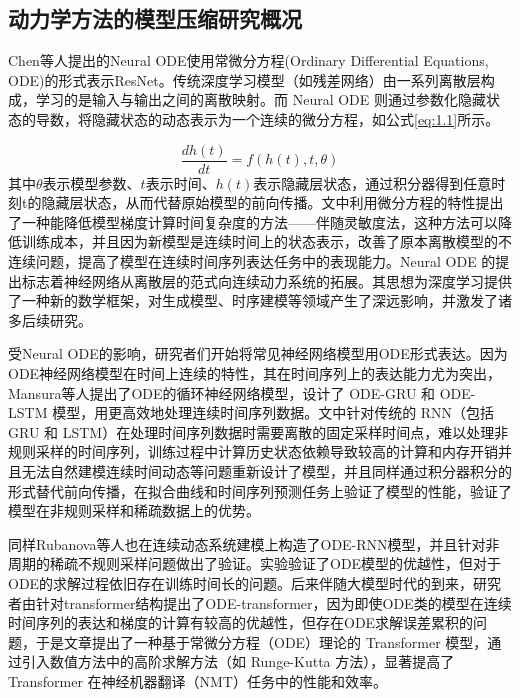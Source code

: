 \subsection{动力学方法的模型压缩研究概况}
Chen等人提出的Neural ODE\cite{chen2018neural}使用常微分方程(Ordinary Differential Equations, ODE)的形式表示ResNet\cite{he2016deep}。传统深度学习模型（如残差网络）由一系列离散层构成，学习的是输入与输出之间的离散映射。而 Neural ODE 则通过参数化隐藏状态的导数，将隐藏状态的动态表示为一个连续的微分方程，如公式\ref{eq:1.1}所示。

\begin{equation}
\label{eq:1.1}
\frac{{dh(t)}}{{dt}} = f(h(t),t,\theta )
\end{equation}
其中$\theta $表示模型参数、$t$表示时间、$h(t)$表示隐藏层状态，通过积分器得到任意时刻t的隐藏层状态，从而代替原始模型的前向传播。文中利用微分方程的特性提出了一种能降低模型梯度计算时间复杂度的方法——伴随灵敏度法，这种方法可以降低训练成本，并且因为新模型是连续时间上的状态表示，改善了原本离散模型的不连续问题，提高了模型在连续时间序列表达任务中的表现能力。Neural ODE 的提出标志着神经网络从离散层的范式向连续动力系统的拓展。其思想为深度学习提供了一种新的数学框架，对生成模型、时序建模等领域产生了深远影响，并激发了诸多后续研究。

受Neural ODE的影响，研究者们开始将常见神经网络模型用ODE形式表达。因为ODE神经网络模型在时间上连续的特性，其在时间序列上的表达能力尤为突出，Mansura等人提出了ODE的循环神经网络模型\cite{habiba2020neural}，设计了 ODE-GRU 和 ODE-LSTM 模型，用更高效地处理连续时间序列数据。文中针对传统的 RNN（包括 GRU 和 LSTM）在处理时间序列数据时需要离散的固定采样时间点，难以处理非规则采样的时间序列，训练过程中计算历史状态依赖导致较高的计算和内存开销并且无法自然建模连续时间动态等问题重新设计了模型，并且同样通过积分器积分的形式替代前向传播，在拟合曲线和时间序列预测任务上验证了模型的性能，验证了模型在非规则采样和稀疏数据上的优势。

同样Rubanova\cite{rubanova2019latent}等人也在连续动态系统建模上构造了ODE-RNN模型，并且针对非周期的稀疏不规则采样问题做出了验证。实验验证了ODE模型的优越性，但对于ODE的求解过程依旧存在训练时间长的问题。后来伴随大模型时代的到来，研究者由针对transformer结构提出了ODE-transformer\cite{li2021ode}，因为即使ODE类的模型在连续时间序列的表达和梯度的计算有较高的优越性，但存在ODE求解误差累积的问题，于是文章提出了一种基于常微分方程（ODE）理论的 Transformer 模型，通过引入数值方法中的高阶求解方法（如 Runge-Kutta 方法），显著提高了 Transformer 在神经机器翻译（NMT）任务中的性能和效率。

